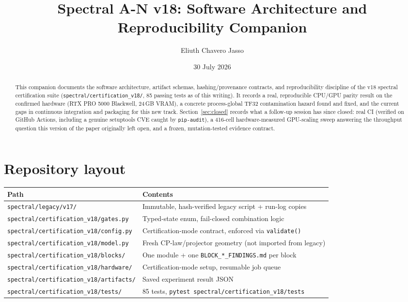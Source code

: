 \documentclass[11pt]{amsart}
\title[Spectral A-N v18: Software and Reproducibility]{Spectral A-N v18: Software Architecture and Reproducibility Companion}
\author{Eliuth Chavero Jasso}
\date{30 July 2026}
\begin{document}
\maketitle

\begin{abstract}
This companion documents the software architecture, artifact schemas,
hashing/provenance contracts, and reproducibility discipline of the v18
spectral certification suite (\texttt{spectral/certification\_v18/}, 85
passing tests as of this writing). It records a real, reproducible
CPU/GPU parity result on the confirmed hardware (RTX PRO 5000 Blackwell,
24\,GB VRAM), a concrete process-global TF32 contamination hazard found and
fixed, and the current gaps in continuous integration and packaging for
this new track. Section~\ref{sec:closed} records what a follow-up session
has since closed: real CI (verified on GitHub Actions, including a
genuine setuptools CVE caught by \texttt{pip-audit}), a 416-cell
hardware-measured GPU-scaling sweep answering the throughput question
this version of the paper originally left open, and a frozen,
mutation-tested evidence contract.
\end{abstract}

\section{Repository layout}
\begin{center}
\small
\begin{tabularx}{\linewidth}{lX}
\toprule
Path & Contents \\
\midrule
\texttt{spectral/legacy/v17/} & Immutable, hash-verified legacy script + run-log copies \\
\texttt{spectral/certification\_v18/gates.py} & Typed-state enum, fail-closed combination logic \\
\texttt{spectral/certification\_v18/config.py} & Certification-mode contract, enforced via \texttt{validate()} \\
\texttt{spectral/certification\_v18/model.py} & Fresh CP-law/projector geometry (not imported from legacy) \\
\texttt{spectral/certification\_v18/blocks/} & One module + one \texttt{BLOCK\_*\_FINDINGS.md} per block \\
\texttt{spectral/certification\_v18/hardware/} & Certification-mode setup, resumable job queue \\
\texttt{spectral/certification\_v18/artifacts/} & Saved experiment result JSON \\
\texttt{spectral/certification\_v18/tests/} & 85 tests, \texttt{pytest spectral/certification\_v18/tests} \\
\bottomrule
\end{tabularx}
\end{center}
\end{document}
